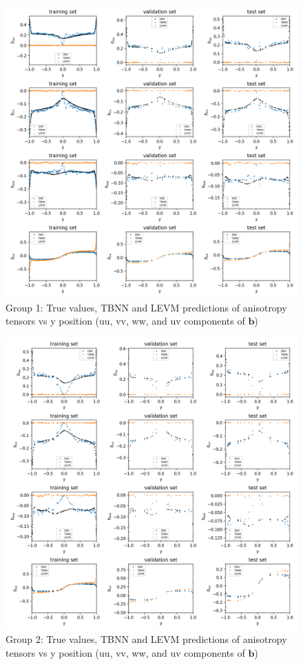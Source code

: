 \documentclass{article}
\numberwithin{equation}{section}
\begin{document}
\begin{figure}[h]
    \centering
    \includegraphics[width=1.0\linewidth]{results/512samples/b_vs_y.png}
    \caption{Group 1: True values, TBNN and LEVM predictions of anisotropy tensors vs y position (uu, vv, ww, and uv components of $\mathbf{b}$)}
    \label{fig:b_vs_y_group1}
\end{figure}

\begin{figure}[h]
    \centering
    \includegraphics[width=1.0\linewidth]{results/170samples/b_vs_y.png}
    \caption{Group 2: True values, TBNN and LEVM predictions of anisotropy tensors vs y position (uu, vv, ww, and uv components of $\mathbf{b}$)}
    \label{fig:b_vs_y_group2}
\end{figure}
\end{document}

